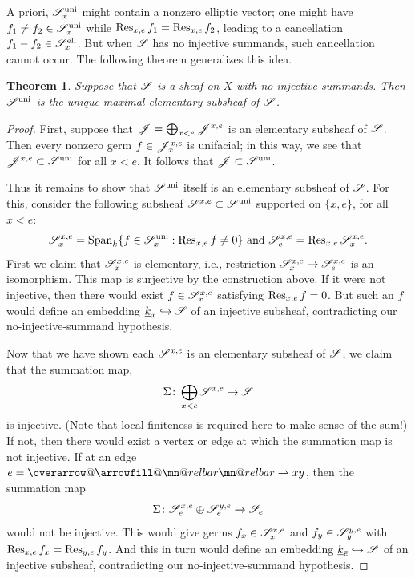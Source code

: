\documentclass[letter]{amsart}
\makeatletter
\newtheorem{thm}{Theorem}[section]
\theoremstyle{definition}
\theoremstyle{remark}
\numberwithin{thm}{section}
\numberwithin{equation}{section}
\DeclareRobustCommand{\overrightharpoon}{\mathpalette{\overarrow@\rightharpoonfill@}}
\def\rightharpoonfill@{\arrowfill@\mn@relbar\mn@relbar\rightharpoonup}
\newcommand{\edge}[1]{\overrightharpoon{#1}}
\newcommand{\constsheaf}[1]{{\underline{#1}}}
\DeclareMathOperator{\uni}{uni}
\DeclareMathOperator{\el}{ell}
\makeatother
\begin{document}
A priori, $\sheaf{S}_x^{\uni}$ might contain a nonzero elliptic vector; one might have $f_1 \neq f_2 \in \sheaf{S}_x^{\uni}$ while $\operatorname{Res}_{x,e} f_1 = \operatorname{Res}_{x,e} f_2$, leading to a cancellation $f_1 - f_2 \in \sheaf{S}_x^{\el}$.  But when ${\mathscr{S}}$ has no injective summands, such cancellation cannot occur.  The following theorem generalizes this idea. 

\begin{thm}
\label{uni-elementary}
Suppose that ${\mathscr{S}}$ is a sheaf on $X$ with no injective summands.  Then $\sheaf{S}^{\uni}$ is the unique maximal elementary subsheaf of ${\mathscr{S}}$.  
\end{thm}
\begin{proof}
First, suppose that ${\mathscr{J}} = \bigoplus_{x < e} {\mathscr{J}}^{x,e}$ is an elementary subsheaf of ${\mathscr{S}}$.  Then every nonzero germ $f \in {\mathscr{J}}_x^{x,e}$ is unifacial; in this way, we see that $\sheaf{J}^{x,e} \subset \sheaf{S}^{\uni}$ for all $x < e$.  It follows that $\sheaf{J} \subset \sheaf{S}^{\uni}$.  

Thus it remains to show that $\sheaf{S}^{\uni}$ itself is an elementary subsheaf of ${\mathscr{S}}$.  For this, consider the following subsheaf $\sheaf{S}^{x,e} \subset \sheaf{S}^{\uni}$ supported on $\{ x,e \}$, for all $x < e$:
$$\sheaf{S}_x^{x,e} = \Span_k \{ f \in \sheaf{S}_x^{\uni} : \Res_{x,e} f \neq 0 \} \text{ and } \sheaf{S}_e^{x,e} = \Res_{x,e} \sheaf{S}_x^{x,e}.$$
First we claim that ${\mathscr{S}}_x^{x,e}$ is elementary, i.e., restriction ${\mathscr{S}}_x^{x,e} \rightarrow {\mathscr{S}}_e^{x,e}$ is an isomorphism. This map is surjective by the construction above.  If it were not injective, then there would exist $f \in {\mathscr{S}}_x^{x,e}$ satisfying $\operatorname{Res}_{x,e} f = 0$.  But such an $f$ would define an embedding $\constsheaf{k}_x \Into \sheaf{S}$ of an injective subsheaf, contradicting our no-injective-summand hypothesis.

Now that we have shown each ${\mathscr{S}}^{x,e}$ is an elementary subsheaf of ${\mathscr{S}}$, we claim that the summation map,
$$\Sigma \colon \bigoplus_{x < e} {\mathscr{S}}^{x,e} \rightarrow {\mathscr{S}}$$
is injective.  (Note that local finiteness is required here to make sense of the sum!)  If not, then there would exist a vertex or edge at which the summation map is not injective.  If at an edge $e = \edge{xy}$, then the summation map
$$\Sigma \colon {\mathscr{S}}_e^{x,e} \oplus {\mathscr{S}}_e^{y,e} \rightarrow {\mathscr{S}}_e$$
would not be injective.  This would give germs $f_x \in {\mathscr{S}}_x^{x,e}$ and $f_y \in {\mathscr{S}}_y^{y,e}$ with $\operatorname{Res}_{x,e} f_x = \operatorname{Res}_{y,e} f_y$.  And this in turn would define an embedding $\constsheaf{k}_{\bar e} \Into \sheaf{S}$ of an injective subsheaf, contradicting our no-injective-summand hypothesis.


\end{proof}
\end{document}

